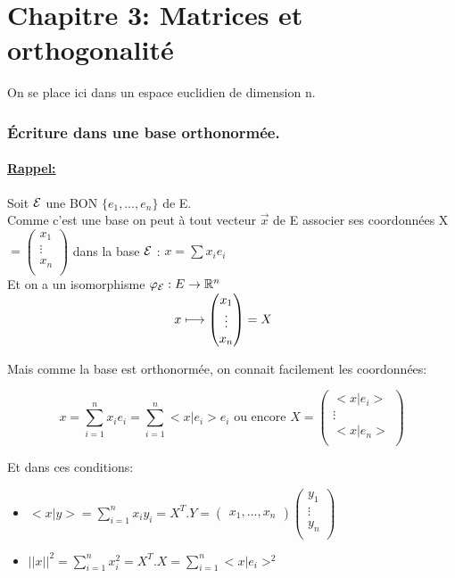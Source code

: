 \documentclass{article}
\author{Frederic Becerril}
\newcommand\tab[1][1cm]{\hspace*{#1}}
\begin{document}
\part*{Chapitre 3: Matrices et orthogonalité}

On se place ici dans un espace euclidien de dimension n.

\section{Écriture dans une base orthonormée.}

\subsection{\underline{Rappel:}}
Soit $\cal{E}$ une BON $\{e_1, \dots, e_n\}$ de E.\\
Comme c'est une base on peut à tout vecteur $\vec{x}$ de E associer ses coordonnées X $= \begin{pmatrix}
    x_1\\
    \vdots\\
    x_n\\
\end{pmatrix}$ dans la base $\cal{E}$ : $x = \sum x_i e_i$\\
Et on a un isomorphisme $\varphi_{\cal{E}} : E \rightarrow \mathbb{R}^n$\\
$\tab[4.7cm] x \longmapsto \begin{pmatrix}
    x_1\\
    \vdots\\
    x_n\\
\end{pmatrix} = X$

Mais comme la base est orthonormée, on connait facilement les coordonnées:

$$x = \sum_{i = 1}^n x_i e_i = \sum_{i = 1}^n <x | e_i> e_i \mbox{ ou encore } X = \begin{pmatrix}
    <x | e_i>\\
    \vdots\\
    <x | e_n>\\
\end{pmatrix}$$

Et dans ces conditions:
\begin{itemize}
    \item $<x | y> = \sum_{i = 1}^n x_i y_i = X^T . Y = \begin{pmatrix}
        x_1,
        \dots,
        x_n
    \end{pmatrix}
    \begin{pmatrix}
        y_1\\
        \vdots\\
        y_n\\
    \end{pmatrix}$
    \item $||x||^2 = \sum_{i = 1}^n x_i^2 = X^T . X = \sum_{i = 1}^n <x | e_i>^2$
\end{itemize}
\end{document}

